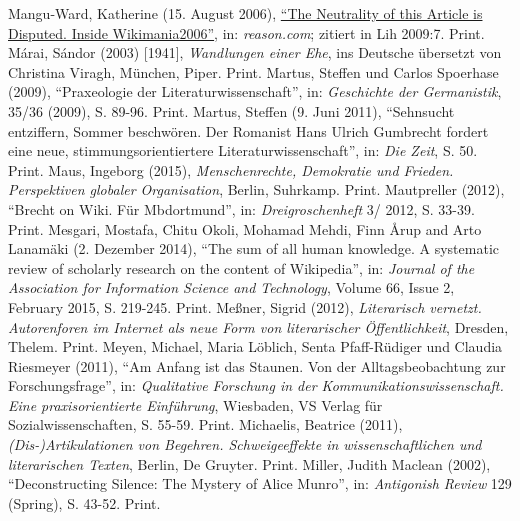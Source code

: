 \documentclass[fontsize=12pt]{scrartcl}
\begin{document}
{{{{\begin{thebibliography}
	Mangu-Ward, Katherine (15. August 2006), \href{http://reason.com/archives/2006/08/15/the-neutrality-of-this-article}{"`The Neutrality of this Article is Disputed. Inside Wikimania2006"'}, in: \textit{reason.com}; zitiert in Lih 2009:7. Print.
	M\'{a}rai, S\'{a}ndor (2003) [1941], \textit{Wandlungen einer Ehe}, ins Deutsche \"ubersetzt von Christina Viragh, M\"unchen, Piper. Print.
	Martus, Steffen und Carlos Spoerhase (2009), "`Pra\-xe\-o\-lo\-gie der Li\-te\-ra\-tur\-wis\-sen\-schaft"', in: \textit{Geschichte der Germanistik}, 35/36 (2009), S. 89-96. Print.
	Martus, Steffen (9. Juni 2011), "`Sehnsucht entziffern, Sommer beschw\"oren. Der Romanist Hans Ulrich Gumbrecht fordert eine neue, \flq stimmungsorientiertere\frq\,\,Li\-te\-ra\-tur\-wissen\-schaft"', in: \textit{Die Zeit}, S. 50. Print.
	Maus, Ingeborg (2015), \textit{Menschenrechte, Demokratie und Frieden. Perspektiven globaler Organisation}, Ber\-lin, Suhr\-kamp. Print.
	Mautpreller (2012), "`Brecht on Wiki. F\"ur Mbdortmund"', in: \textit{Drei\-gro\-schen\-heft} 3/ 2012, S. 33-39. Print.
	Mesgari, Mostafa, Chitu Okoli, Mohamad Mehdi, Finn \r{A}rup and Arto Lanam\"aki (2. Dezember 2014), "`\flq The sum of all human know\-ledge\frq. A systematic review of scholarly research on the content of Wi\-ki\-pe\-dia"', in: \textit{Journal of the Association for Information Science and Technology}, Volume 66, Issue 2, February 2015, S. 219-245. Print.
	Me{\ss}ner, Sigrid (2012), \textit{Li\-te\-ra\-risch vernetzt. Autorenforen im Internet als neue Form von li\-te\-ra\-rischer \"Of\-fent\-lichkeit}, Dresden, Thelem. Print.
	Meyen, Michael, Maria L\"oblich, Senta Pfaff-R\"udiger und Claudia Riesmeyer (2011), "`Am Anfang ist das Staunen. Von der All\-tagsbeobachtung zur For\-schungsfrage"', in: \textit{Qualitative For\-schung in der Kommunikationswissenschaft. Eine praxisorientierte Einf\"uh\-rung}, Wiesbaden, VS Verlag f\"ur Sozialwissenschaften, S. 55-59. Print.
	Michaelis, Beatrice (2011), \textit{(Dis-)Artikulationen von Begehren. Schweigeeffekte in wissenschaftlichen und li\-te\-ra\-rischen Texten}, Berlin, De Gruyter. Print.
	Miller, Judith Maclean (2002), "`Deconstructing Silence: The Mystery of Alice Mun\-ro"', in: \textit{Antigonish Review} 129 (Spring), S. 43-52. Print.

\end{thebibliography}}}}}
\end{document}
